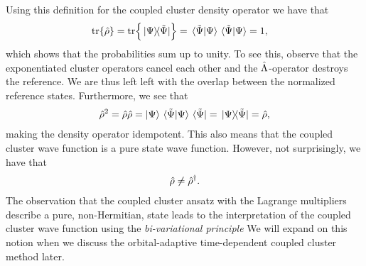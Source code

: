             Using this definition for the coupled cluster density operator we
            have that
            \begin{align}
                \tr{\density}
                &= \tr{\dyad*{\Psi}{\tilde{\Psi}}}
                = \bra*{\tilde{\Psi}}\ket{\Psi}
                \bra*{\tilde{\Psi}}\ket{\Psi}
                = 1,
            \end{align}
            which shows that the probabilities sum up to unity.
            To see this, observe that the exponentiated cluster operators cancel
            each other and the $\hat{\Lambda}$-operator destroys the reference.
            We are thus left left with the overlap between the normalized
            reference states.
            Furthermore, we see that
            \begin{align}
                \density^2
                = \density\density
                = \ket{\Psi}\braket*{\tilde{\Psi}}{\Psi}
                \bra*{\tilde{\Psi}}
                = \dyad*{\Psi}{\tilde{\Psi}}
                = \density,
            \end{align}
            making the density operator idempotent.
            This also means that the coupled cluster wave function is a pure
            state wave function.
            However, not surprisingly, we have that
            \begin{align}
                \hat{\rho} \neq \hat{\rho}^{\dagger}.
            \end{align}
            The observation that the coupled cluster ansatz with the Lagrange
            multipliers describe a pure, non-Hermitian, state leads to the
            interpretation of the coupled cluster wave function using the
            \emph{bi-variational principle} \cite{arponen1983311, lowdin-bi,
            kvaal2012ab, kvaal2013variational}
            We will expand on this notion when we discuss the orbital-adaptive
            time-dependent coupled cluster method later.

